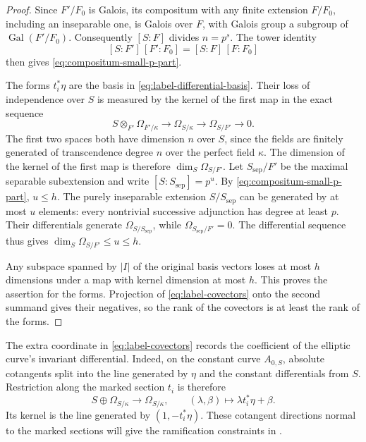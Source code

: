 \begin{proof}
Since $F'/F_0$ is Galois, its compositum with any finite extension
$F/F_0$, including an inseparable one, is Galois over $F$, with
Galois group a subgroup of $\operatorname{Gal}(F'/F_0)$.
Consequently $[S:F]$ divides $n=p^s$.  The tower identity
\[
                    [S:F']\,[F':F_0]=[S:F]\,[F:F_0]
\]
then gives \eqref{eq:compositum-small-p-part}.

The forms $t_i^*\eta$ are the basis in
\eqref{eq:label-differential-basis}. Their loss of independence over $S$ is measured
by the kernel of the first map in the exact sequence
\[
 S\otimes_{F'}\Omega_{F'/\kappa}
       \longrightarrow\Omega_{S/\kappa}
       \longrightarrow\Omega_{S/F'}\longrightarrow0.
\]
The first two spaces both have dimension $n$ over $S$, since the
fields are finitely generated of transcendence degree $n$ over the
perfect field $\kappa$.  The dimension of the kernel of the first
map is therefore $\dim_S\Omega_{S/F'}$.
Let $S_{\mathrm{sep}}/F'$ be the maximal separable subextension and
write $[S:S_{\mathrm{sep}}]=p^u$.  By
\eqref{eq:compositum-small-p-part}, $u\leq h$.  The purely
inseparable extension $S/S_{\mathrm{sep}}$ can be generated by at
most $u$ elements: every nontrivial successive adjunction has degree
at least $p$.  Their differentials generate
$\Omega_{S/S_{\mathrm{sep}}}$, while
$\Omega_{S_{\mathrm{sep}}/F'}=0$.  The differential sequence thus
gives $\dim_S\Omega_{S/F'}\leq u\leq h$.

Any subspace spanned by $|I|$ of the original basis vectors loses
at most $h$ dimensions under a map with kernel dimension at most
$h$.  This proves the assertion for the forms.  Projection of
\eqref{eq:label-covectors} onto the second summand gives their
negatives, so the rank of the covectors is at least the rank of the
forms.
\end{proof}

The extra coordinate in \eqref{eq:label-covectors} records the
coefficient of the elliptic curve's invariant differential. Indeed,
on the constant curve $A_{0,S}$, absolute cotangents split into the
line generated by $\eta$ and the constant differentials from $S$.
Restriction along the marked section $t_i$ is therefore
\[
 S\oplus\Omega_{S/\kappa}\longrightarrow\Omega_{S/\kappa},
 \qquad (\lambda,\beta)\longmapsto\lambda t_i^*\eta+\beta.
\]
Its kernel is the line generated by $(1,-t_i^*\eta)$. These
cotangent directions normal to the marked sections will give the
ramification constraints in .
